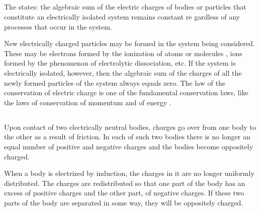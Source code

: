\subsection{}\label{14.1.3} The  states: the algebraic sum of the electric charges of bodies or particles that constitute an electrically isolated system remains constant re­ gardless of any processes that occur in the system.

New electrically charged particles may be formed in the system being considered. These may be electrons formed by the ionization of atoms or molecules , ions formed by the phenomenon of electrolytic dissociation, etc. If the system is electrically isolated, however, then the algebraic sum of the charges of all the newly formed particles of the system always equals zero. The law of the conservation of electric charge is one of the fundamental conservation laws, like the laws of conservation of momentum  and of energy .

\subsection{}\label{14.1.4} Upon contact of two electrically neutral bodies, charges go over from one body to the other as a result of friction. In each of such two bodies there is no longer an equal number of positive and negative charges and the bodies become oppositely charged.

When a body is electrized by induction, the charges in it are no longer uniformly distributed. The charges are redistributed so that one part of the body has an excess of positive charges and the other part, of negative charges. If these two parts of the body are separated in some way, they will be oppositely charged.



